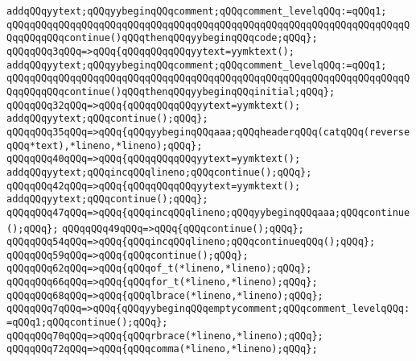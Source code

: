 \verb|addqQQqyytext;qQQqyybeginqQQqcomment;qQQqcomment_levelqQQq:=qQQq1;|\newline
\verb|qQQqqQQqqQQqqQQqqQQqqQQqqQQqqQQqqQQqqQQqqQQqqQQqqQQqqQQqqQQqqQQqqQQqqQQqqQQqqQQqcontinue()qQQqthenqQQqyybeginqQQqcode;qQQq};|\newline
\verb|qQQqqQQq3qQQq=>qQQq{qQQqqQQqqQQqyytext=yymktext();|\newline
\verb|addqQQqyytext;qQQqyybeginqQQqcomment;qQQqcomment_levelqQQq:=qQQq1;|\newline
\verb|qQQqqQQqqQQqqQQqqQQqqQQqqQQqqQQqqQQqqQQqqQQqqQQqqQQqqQQqqQQqqQQqqQQqqQQqqQQqqQQqcontinue()qQQqthenqQQqyybeginqQQqinitial;qQQq};|\newline
\verb|qQQqqQQq32qQQq=>qQQq{qQQqqQQqqQQqyytext=yymktext();|\newline
\verb|addqQQqyytext;qQQqcontinue();qQQq};|\newline
\verb|qQQqqQQq35qQQq=>qQQq{qQQqyybeginqQQqaaa;qQQqheaderqQQq(catqQQq(reverseqQQq*text),*lineno,*lineno);qQQq};|\newline
\verb|qQQqqQQq40qQQq=>qQQq{qQQqqQQqqQQqyytext=yymktext();|\newline
\verb|addqQQqyytext;qQQqincqQQqlineno;qQQqcontinue();qQQq};|\newline
\verb|qQQqqQQq42qQQq=>qQQq{qQQqqQQqqQQqyytext=yymktext();|\newline
\verb|addqQQqyytext;qQQqcontinue();qQQq};|\newline
\verb|qQQqqQQq47qQQq=>qQQq{qQQqincqQQqlineno;qQQqyybeginqQQqaaa;qQQqcontinue();qQQq};|\newline
\verb|qQQqqQQq49qQQq=>qQQq{qQQqcontinue();qQQq};|\newline
\verb|qQQqqQQq54qQQq=>qQQq{qQQqincqQQqlineno;qQQqcontinueqQQq();qQQq};|\newline
\verb|qQQqqQQq59qQQq=>qQQq{qQQqcontinue();qQQq};|\newline
\verb|qQQqqQQq62qQQq=>qQQq{qQQqof_t(*lineno,*lineno);qQQq};|\newline
\verb|qQQqqQQq66qQQq=>qQQq{qQQqfor_t(*lineno,*lineno);qQQq};|\newline
\verb|qQQqqQQq68qQQq=>qQQq{qQQqlbrace(*lineno,*lineno);qQQq};|\newline
\verb|qQQqqQQq7qQQq=>qQQq{qQQqyybeginqQQqemptycomment;qQQqcomment_levelqQQq:=qQQq1;qQQqcontinue();qQQq};|\newline
\verb|qQQqqQQq70qQQq=>qQQq{qQQqrbrace(*lineno,*lineno);qQQq};|\newline
\verb|qQQqqQQq72qQQq=>qQQq{qQQqcomma(*lineno,*lineno);qQQq};|\newline

